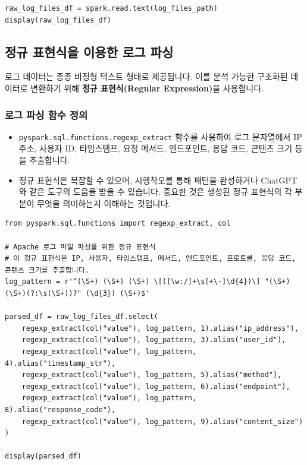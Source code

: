 \documentclass[11pt,a4paper]{article}
\theoremstyle{definition}
\begin{document}
\begin{lstlisting}[label={lst:raw_log_df}]
raw_log_files_df = spark.read.text(log_files_path)
display(raw_log_files_df)
\end{lstlisting}

\subsection{정규 표현식을 이용한 로그 파싱}

\begin{conceptbox}
로그 데이터는 종종 비정형 텍스트 형태로 제공됩니다. 이를 분석 가능한 구조화된 데이터로 변환하기 위해 \textbf{정규 표현식(Regular Expression)}을 사용합니다.
\end{conceptbox}

\subsubsection{로그 파싱 함수 정의}
\begin{itemize}
    \item \texttt{pyspark.sql.functions.regexp_extract} 함수를 사용하여 로그 문자열에서 IP 주소, 사용자 ID, 타임스탬프, 요청 메서드, 엔드포인트, 응답 코드, 콘텐츠 크기 등을 추출합니다.
    \item 정규 표현식은 복잡할 수 있으며, 시행착오를 통해 패턴을 완성하거나 ChatGPT와 같은 도구의 도움을 받을 수 있습니다. 중요한 것은 생성된 정규 표현식의 각 부분이 무엇을 의미하는지 이해하는 것입니다.
\end{itemize}

\begin{lstlisting}[label={lst:parse_log_regex}]
from pyspark.sql.functions import regexp_extract, col

# Apache 로그 파일 파싱을 위한 정규 표현식
# 이 정규 표현식은 IP, 사용자, 타임스탬프, 메서드, 엔드포인트, 프로토콜, 응답 코드, 콘텐츠 크기를 추출합니다.
log_pattern = r'^(\S+) (\S+) (\S+) \[([\w:/]+\s[+\-]\d{4})\] "(\S+) (\S+)(?:\s(\S+))?" (\d{3}) (\S+)$'

parsed_df = raw_log_files_df.select(
    regexp_extract(col("value"), log_pattern, 1).alias("ip_address"),
    regexp_extract(col("value"), log_pattern, 3).alias("user_id"),
    regexp_extract(col("value"), log_pattern, 4).alias("timestamp_str"),
    regexp_extract(col("value"), log_pattern, 5).alias("method"),
    regexp_extract(col("value"), log_pattern, 6).alias("endpoint"),
    regexp_extract(col("value"), log_pattern, 8).alias("response_code"),
    regexp_extract(col("value"), log_pattern, 9).alias("content_size")
)

display(parsed_df)
\end{lstlisting}
\end{document}

